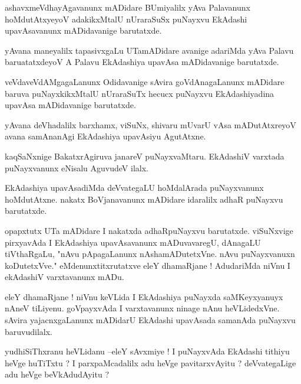 \documentclass{article}
\begin{document}
\begin{mn}%
ashavxmeVdhayAgavanunx mADidare BUmiyalilx yAva Palavanunx hoMdutAtxyeyoV adakikxMtalU nUraraSuSx 
puNayxvu EkAdashi upavAsavanunx mADidavanige barutatxde.
\end{mn}

\begin{mn}%
yAvana maneyalilx tapasivxgaLu UTamADidare avanige adariMda yAva Palavu baruatatxdeyoV A Palavu 
EkAdashiya upavAsa mADidavanige barutatxde.
\end{mn}

\begin{mn}%
veVdaveVdAMgagaLanunx Odidavanige sAvira goVdAnagaLanunx mADidare baruva puNayxkikxMtalU nUraraSuTx 
hecucx puNayxvu EkAdashiyadina upavAsa mADidavanige barutatxde.
\end{mn}

\begin{mn}%
yAvana deVhadalilx barxhamx, viSuNx, shivaru mUvarU vAsa mADutAtxreyoV avana samAnanAgi EkAdashiya 
upavAsiyu AgutAtxne.
\end{mn}

\begin{mn}%
kaqSaNxnige BakatxrAgiruva janareV puNayxvaMtaru. EkAdashiV varxtada puNayxvanunx eNisalu AguvudeV 
ilalx.
\end{mn}

\begin{mn}%
EkAdashiya upavAsadiMda deVvategaLU hoMdalArada puNayxvanunx hoMdutAtxne. nakatx BoVjanavanunx 
mADidare idaralilx adhaR puNayxvu barutatxde.
\end{mn}

\begin{mn}%
opapxtutx UTa mADidare I nakatxda adhaRpuNayxvu barutatxde. viSuNxvige pirxyavAda I EkAdashiya 
upavAsavanunx mADuvavaregU, dAnagaLU tiVthaRgaLu, "nAvu pApagaLanunx nAshamADutetxVne. nAvu 
puNayxvanuxn koDutetxVve." eMdenunxtitxrutatxve eleY dhamaRjane ! AdudariMda niVnu I ekAdashiV 
varxtavanunx mADu.
\end{mn}

\begin{mn}%
eleY dhamaRjane ! niVnu keVLida I EkAdashiya puNayxda saMKeyxyanuyx nAneV tiLiyenu. goVpayxvAda I 
varxtavanunx ninage nAnu heVLidedxVne. sAvira yajacnxgaLanunx mADidarU EkAdashi upavAsada samanAda 
puNayxvu baruvudilalx.
\end{mn}

\begin{mn}%
yudhiSiThxranu heVLidanu --eleY sAvxmiye ! I puNayxvAda EkAdashi tithiyu heVge huTiTxtu ? I 
parxpaMcadalilx adu heVge pavitarxvAyitu ? deVvategaLige adu heVge beVkAdudAyitu ?
\end{mn}
\end{document}
